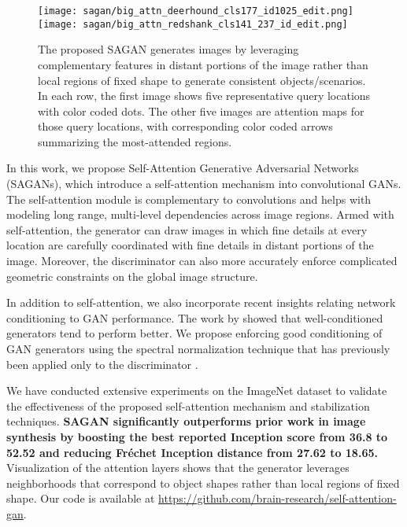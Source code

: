 \documentclass{article}
\begin{document}
\begin{figure*}[tb]
    \centering
    \small
    \texttt{[image: sagan/big\_attn\_deerhound\_cls177\_id1025\_edit.png]}\\
    \vspace{-10pt}
    \texttt{[image: sagan/big\_attn\_redshank\_cls141\_237\_id\_edit.png]}\\
    \vspace{-10pt}
    \caption{
    The proposed SAGAN generates images by leveraging complementary features in distant portions of the image rather than local regions of fixed shape to generate consistent objects/scenarios. 
    In each row, the first image shows five representative query locations with color coded dots. The other five images are attention maps for those query locations, with corresponding color coded arrows summarizing the most-attended regions. 
    }
\label{fig:examples}
 \end{figure*}


In this work, we propose Self-Attention Generative Adversarial Networks (SAGANs), which introduce a self-attention mechanism into convolutional GANs. The self-attention module is complementary to convolutions and helps with  modeling long range, multi-level dependencies across image regions. Armed with self-attention, the generator can draw images in which fine details at every location are carefully coordinated with fine details in distant portions of the image. Moreover, the discriminator can also more accurately enforce complicated geometric constraints on the global image structure.



In addition to self-attention, we also incorporate recent insights relating network conditioning to GAN performance. The work by \cite{Odena18} showed that well-conditioned generators tend to perform better. We propose enforcing good conditioning of GAN generators using the spectral normalization technique that has previously been applied only to the discriminator \cite{Miyato18a}.



We have conducted extensive experiments on the ImageNet dataset to validate the effectiveness of the proposed self-attention mechanism and stabilization techniques. \textbf{SAGAN significantly outperforms prior work in image synthesis by boosting the best reported Inception score from  36.8 to 52.52 and reducing Fr\'echet Inception distance from 27.62 to 18.65.}
Visualization of the attention layers shows that the generator leverages neighborhoods that correspond to object shapes rather than local regions of fixed shape. Our code is available at \url{https://github.com/brain-research/self-attention-gan}.
\end{document}
